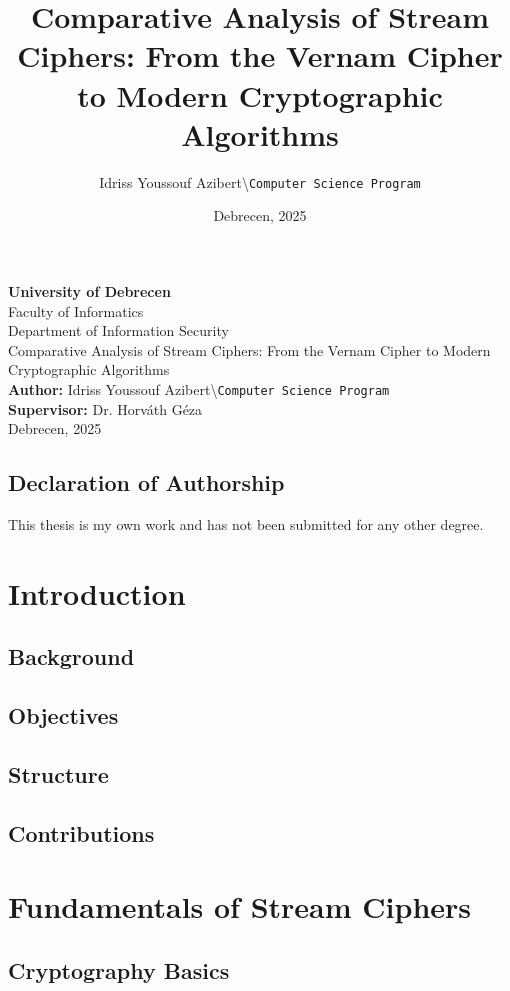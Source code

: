 \documentclass[12pt,a4paper,oneside]{report}
\title{Comparative Analysis of Stream Ciphers: From the Vernam Cipher to Modern Cryptographic Algorithms}
\author{Idriss Youssouf Azibert\textbackslash \texttt{Computer Science Program}}
\date{Debrecen, 2025}
\begin{document}
\begin{titlepage}
\centering
\textbf{University of Debrecen}\\
Faculty of Informatics\\
Department of Information Security\\
\vspace{2cm}
\LARGE{Comparative Analysis of Stream Ciphers: From the Vernam Cipher to Modern Cryptographic Algorithms}\\
\vfill
\textbf{Author:} Idriss Youssouf Azibert\textbackslash \texttt{Computer Science Program}\\
\textbf{Supervisor:} Dr. Horváth Géza\\

\vspace{1cm}
Debrecen, 2025
\end{titlepage}

\newpage
\section*{Declaration of Authorship}
This thesis is my own work and has not been submitted for any other degree.

\newpage
\tableofcontents
\newpage
\listoffigures
\newpage
\listoftables
\newpage
\listofalgorithms
\newpage

\chapter{Introduction}
\section{Background}
\section{Objectives}
\section{Structure}
\section{Contributions}

\chapter{Fundamentals of Stream Ciphers}
\section{Cryptography Basics}
\end{document}
